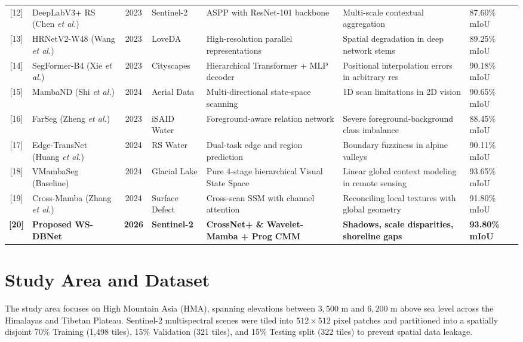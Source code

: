 \documentclass[journal]{IEEEtran}
\begin{document}
\begin{table}[t]
{\begin{tabular}{c l c l l l l}
{[12]} & DeepLabV3+ RS (Chen \textit{et al.}) & 2023 & Sentinel-2 & ASPP with ResNet-101 backbone & Multi-scale contextual aggregation & 87.60\% mIoU \\
{[13]} & HRNetV2-W48 (Wang \textit{et al.}) & 2023 & LoveDA & High-resolution parallel representations & Spatial degradation in deep network stems & 89.25\% mIoU \\
{[14]} & SegFormer-B4 (Xie \textit{et al.}) & 2023 & Cityscapes & Hierarchical Transformer + MLP decoder & Positional interpolation errors in arbitrary res & 90.18\% mIoU \\
{[15]} & MambaND (Shi \textit{et al.}) & 2024 & Aerial Data & Multi-directional state-space scanning & 1D scan limitations in 2D vision & 90.65\% mIoU \\
{[16]} & FarSeg (Zheng \textit{et al.}) & 2023 & iSAID Water & Foreground-aware relation network & Severe foreground-background class imbalance & 88.45\% mIoU \\
{[17]} & Edge-TransNet (Huang \textit{et al.}) & 2024 & RS Water & Dual-task edge and region prediction & Boundary fuzziness in alpine valleys & 90.11\% mIoU \\
{[18]} & VMambaSeg (Baseline) & 2024 & Glacial Lake & Pure 4-stage hierarchical Visual State Space & Linear global context modeling in remote sensing & 93.65\% mIoU \\
{[19]} & Cross-Mamba (Zhang \textit{et al.}) & 2024 & Surface Defect & Cross-scan SSM with channel attention & Reconciling local textures with global geometry & 91.80\% mIoU \\
\textbf{[20]} & \textbf{Proposed WS-DBNet} & \textbf{2026} & \textbf{Sentinel-2} & \textbf{CrossNet+ \& Wavelet-Mamba + Prog CMM} & \textbf{Shadows, scale disparities, shoreline gaps} & \textbf{93.80\% mIoU} \\
\bottomrule
\end{tabular}}
\end{table}

\section{Study Area and Dataset}
The study area focuses on High Mountain Asia (HMA), spanning elevations between $3,500\text{ m}$ and $6,200\text{ m}$ above sea level across the Himalayas and Tibetan Plateau. Sentinel-2 multispectral scenes were tiled into $512 \times 512$ pixel patches and partitioned into a spatially disjoint 70\% Training (1,498 tiles), 15\% Validation (321 tiles), and 15\% Testing split (322 tiles) to prevent spatial data leakage.
\end{document}
